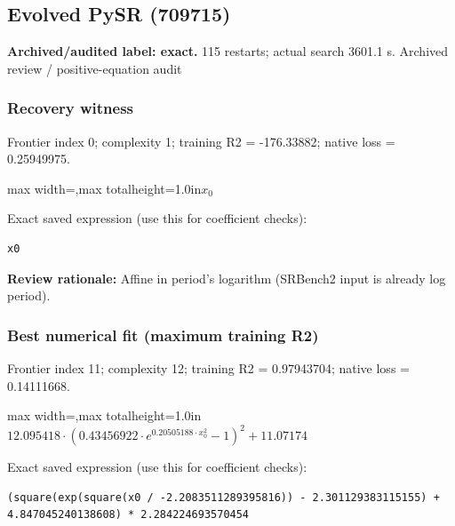 \documentclass[10pt,letterpaper,landscape]{article}
\begin{document}
\begin{minipage}[t]{0.485\textwidth}
\subsection*{Evolved PySR (709715)}
\textbf{Archived/audited label: exact.} 115 restarts; actual search 3601.1 s.
{\small Archived review / positive-equation audit}
\subsubsection*{Recovery witness}
Frontier index 0; complexity 1; training R2 = -176.33882; native loss = 0.25949975.
\begin{center}\begin{adjustbox}{max width=\linewidth,max totalheight=1.0in}$\displaystyle x_{0}$\end{adjustbox}\end{center}
{\scriptsize Exact saved expression (use this for coefficient checks):}
\begin{lstlisting}
x0
\end{lstlisting}
{\small\textbf{Review rationale:} Affine in period's logarithm (SRBench2 input is already log period).}
\subsubsection*{Best numerical fit (maximum training R2)}
Frontier index 11; complexity 12; training R2 = 0.97943704; native loss = 0.14111668.
\begin{center}\begin{adjustbox}{max width=\linewidth,max totalheight=1.0in}$\displaystyle 12.095418 \cdot \left(0.43456922 \cdot e^{0.20505188 \cdot x_{0}^{2}} - 1\right)^{2} + 11.07174$\end{adjustbox}\end{center}
{\scriptsize Exact saved expression (use this for coefficient checks):}
\begin{lstlisting}
(square(exp(square(x0 / -2.2083511289395816)) - 2.301129383115155) + 4.847045240138608) * 2.284224693570454
\end{lstlisting}
\end{minipage}
\clearpage{}\label{leavitt-10004}
\end{document}
